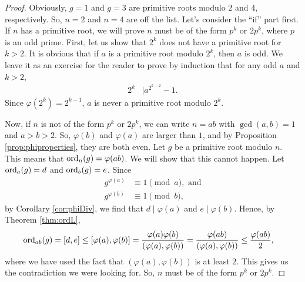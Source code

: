 \documentclass{subfile}
\begin{document}
	\begin{proof}
		Obviously, $g=1$ and $g=3$ are primitive roots modulo $2$ and $4$, respectively. So, $n=2$ and $n=4$ are off the list. Let's consider the ``if'' part first. If $n$ has a primitive root, we will prove $n$ must be of the form $p^k$ or $2p^k$, where $p$ is an odd prime.
		First, let us show that $2^k$ does not have a primitive root for $k >2$. It is obvious that if $a$ is a primitive root modulo $2^k$, then $a$ is odd. We leave it as an exercise for the reader to prove by induction that for any odd $a$ and $k>2$,
			\begin{align*}
				2^k & \mid a^{2^{k-2}}-1.
			\end{align*}
		Since $\varphi(2^k)=2^{k-1}$, $a$ is never a primitive root modulo $2^k$.
		
		Now, if $n$ is not of the form $p^k$ or $2p^k$, we can write $n=ab$ with $\gcd(a,b)=1$ and $a>b>2$. So, $\varphi(b)$ and $\varphi(a)$ are larger than $1$, and by Proposition \ref{prop:phiproperties}, they are both even. Let $g$ be a primitive root modulo $n$. This means that $\operatorname{ord}_{n}(g)=\varphi(ab)$. We will show that this cannot happen. Let $\operatorname{ord}_a(g)=d$ and $\operatorname{ord}_b(g)=e$. Since
			\begin{align*}
				g^{\varphi(a)} & \equiv1\pmod a, \text{ and}\\
				g^{\varphi(b)} & \equiv1\pmod b,
			\end{align*}
		by Corollary \eqref{cor:phiDiv}, we find that $d \mid \varphi(a)$ and $e\mid \varphi(b)$.
		Hence, by Theorem \eqref{thm:ordL},
			\begin{eqnarray*}
				\operatorname{ord}_{ab}(g) & =  [d,e] \leq [\varphi(a),\varphi(b)] = \dfrac{\varphi(a) \varphi(b)}{(\varphi(a), \varphi(b))} = \dfrac{\varphi(ab)}{(\varphi(a), \varphi(b))} \leq  \dfrac{\varphi(ab)}{2},
			\end{eqnarray*}
		where we have used the fact that $(\varphi(a),\varphi(b))$ is at least $2$. This gives us the contradiction we were looking for. So, $n$ must be of the form $p^k$ or $2p^k$.
		

\end{proof}
\end{document}
